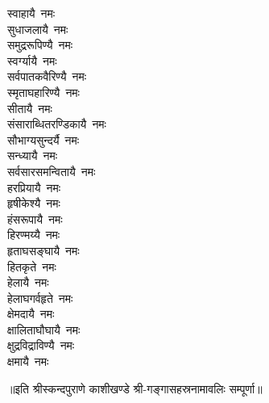 \begin{multicols}{\maxColumns}
\begin{flushleft}
स्वाहायै~नमः\\
सुधाजलायै~नमः\\
समुद्ररूपिण्यै~नमः\hfill{}\\
स्वर्ग्यायै~नमः\\
सर्वपातकवैरिण्यै~नमः\\
स्मृताघहारिण्यै~नमः\\
सीतायै~नमः\\
संसाराब्धितरण्डिकायै~नमः\\
सौभाग्यसुन्दर्यै~नमः\\
सन्ध्यायै~नमः\\
सर्वसारसमन्वितायै~नमः\\
हरप्रियायै~नमः\\
हृषीकेश्यै~नमः\hfill{}\\
हंसरूपायै~नमः\\
हिरण्मय्यै~नमः\\
हृताघसङ्घायै~नमः\\
हितकृते~नमः\\
हेलायै~नमः\\
हेलाघगर्वहृते~नमः\\
क्षेमदायै~नमः\\
क्षालिताघौघायै~नमः\\
क्षुद्रविद्राविण्यै~नमः\\
क्षमायै~नमः\hfill{}\\
\end{flushleft}
\end{multicols}
\centerline{॥इति श्रीस्कन्दपुराणे काशीखण्डे श्री-गङ्गासहस्रनामावलिः सम्पूर्णा॥}
